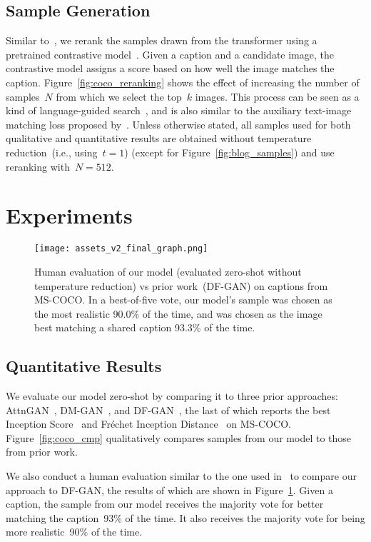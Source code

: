 \documentclass{article}
\begin{document}
\subsection{Sample Generation}
Similar to~\citet{razavi2019generating}, we rerank the samples drawn from the transformer using a pretrained contrastive model~\cite{radford2021learning}. Given a caption and a candidate image, the contrastive model assigns a score  based on how well the image matches the caption. Figure~\ref{fig:coco_reranking} shows the effect of increasing the number of samples~$N$ from which we select the top~$k$ images. This process can be seen as a kind of language-guided search~\cite{andreas2017learning}, and is also similar to the auxiliary text-image matching loss proposed by~\citet{xu2018attngan}. Unless otherwise stated, all samples used for both qualitative and quantitative results are obtained without temperature reduction~(i.e., using~$t=1$) (except for Figure~\ref{fig:blog_samples}) and use reranking with~$N = 512$.

\section{Experiments}
\label{sec:experiments}
\begin{figure}[t]
    \centering
    \texttt{[image: assets\_v2\_final\_graph.png]}
    \caption{Human evaluation of our model (evaluated zero-shot without temperature reduction) vs prior work~(DF-GAN) on captions from MS-COCO. In a best-of-five vote, our model's sample was chosen as the most realistic 90.0\% of the time, and was chosen as the image best matching a shared caption 93.3\% of the time.}
    \label{fig:human_eval}
\end{figure}


\subsection{Quantitative Results}

We evaluate our model zero-shot by comparing it to three prior approaches: AttnGAN~\cite{xu2018attngan}, DM-GAN~\cite{zhu2019dm}, and DF-GAN~\cite{tao2020df}, the last of which reports the best Inception Score~\cite{salimans2016improved} and Fr\'echet Inception Distance~\cite{heusel2017gans} on MS-COCO. Figure~\ref{fig:coco_cmp} qualitatively compares samples from our model to those from prior work.

We also conduct a human evaluation similar to the one used in~\citet{koh2021text} to compare our approach to DF-GAN, the results of which are shown in Figure~\ref{fig:human_eval}. Given a caption, the sample from our model receives the majority vote for better matching the caption~93\% of the time. It also receives the majority vote for being more realistic~90\% of the time.
\end{document}
